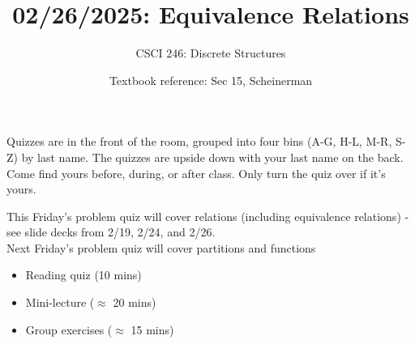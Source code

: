 \documentclass[10pt]{beamer}
\begin{document}






\title{02/26/2025: Equivalence Relations}
\author{CSCI 246: Discrete Structures}
\date{Textbook reference: Sec 15, Scheinerman}

\begin{frame}
    \titlepage 
\end{frame}


\begin{frame}
\footnotesize 
\begin{mygreenbox}[title=Graded Quiz Pickup]
Quizzes are in the front of the room, grouped into four bins (A-G, H-L, M-R, S-Z) by last name. The quizzes are upside down with your last name on the back. Come find yours before, during, or after class.  Only turn the quiz over if it's yours.
\end{mygreenbox} 
\vfill 

\begin{myredbox}[title=Announcements]

This Friday's problem quiz will cover relations (including equivalence relations) - see slide decks from 2/19, 2/24, and 2/26.  \\

Next Friday's problem quiz will cover partitions and functions

\end{myredbox}

\vfill 


\begin{myyellowbox}[title=Today's Agenda]
\begin{itemize}
	\item Reading quiz (10 mins)
	\item Mini-lecture ($\approx$ 20 mins)
	\item Group exercises ($\approx$ 15 mins)
\end{itemize}

%	
\end{myyellowbox}
\vfill 

\end{frame}
\end{document}
